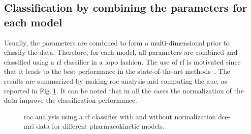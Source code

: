 \subsection{Classification by combining the parameters for each model}

Usually, the parameters are combined to form a multi-dimensional prior to classify the data.
Therefore, for each model, all parameters are combined and classified using a \ac{rf} classifier in a \ac{lopo} fashion.
The use of \ac{rf} is motivated since that it leads to the best performance in the state-of-the-art methods~\citep{litjens2014computer}.
The results are summarized by making \ac{roc} analysis and computing the \ac{auc}, as reported in Fig.\,\ref{fig:normpharmarf}.
It can be noted that in all the cases the normalization of the data improve the classification performance.

\begin{figure}
  \centering
  \hspace*{\fill}
   \hfill
  \hspace*{\fill}
  \caption{\acs*{roc} analysis using a \acs*{rf} classifier with and without normalization \ac{dce}-\ac{mri} data for different pharmacokinetic models.}
  \label{fig:normpharmarf}
\end{figure}

